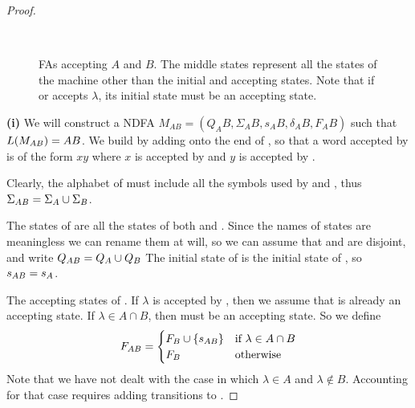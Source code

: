 \documentclass{bcthesis}
\begin{document}
\begin{proof}
		\begin{figure}[H]
			\centering
			\setlength{\fboxrule}{0 pt}
			\\
			\caption{
			FAs accepting $A$ and $B$.
			The middle states represent all the states of the machine other than the initial and accepting states.
			Note that if \ma or \mb accepts $\lambda$, its initial state must be an accepting state.
			}
			\label{fig:ma_and_mb}
		\end{figure}

		\textbf{(i)}
		We will construct a NDFA $M_{AB} = (Q_AB, \Sigma_AB, s_AB, \delta_AB, F_AB)$ such that $L(M_{AB}) = AB$.
		We build \mab by adding \mb onto the end of \ma, so that a word accepted by \mab is of the form $xy$ where $x$ is accepted by \ma and $y$ is accepted by \mb.

		Clearly, the alphabet of \mab must include all the symbols used by \ma and \mb, thus $\Sigma_{AB} = \Sigma_A \cup \Sigma_B$.
		
		The states of \mab are all the states of both \ma and \mb.
		Since the names of states are meaningless we can rename them at will, so we can assume that \qa and \qb are disjoint, and write $Q_{AB} = Q_A \cup Q_B$
		The initial state of \mab is the initial state of \ma, so $s_{AB} = s_A$.

		The accepting states of \mab.
		If $\lambda$ is accepted by \mb, then we assume that \sb is already an accepting state.
		If $\lambda \in A \cap B$, then \sab must be an accepting state.
		So we define
		\[
			F_{AB} = 	\begin{cases}
						F_B \cup \{ s_{AB} \} &\text{if } \lambda \in A \cap B \\
						F_B &\text{otherwise}
					\end{cases}
		\]
		Note that we have not dealt with the case in which $\lambda \in A$ and $\lambda \notin B$.
		Accounting for that case requires adding transitions to \mab.


\end{proof}
\end{document}
